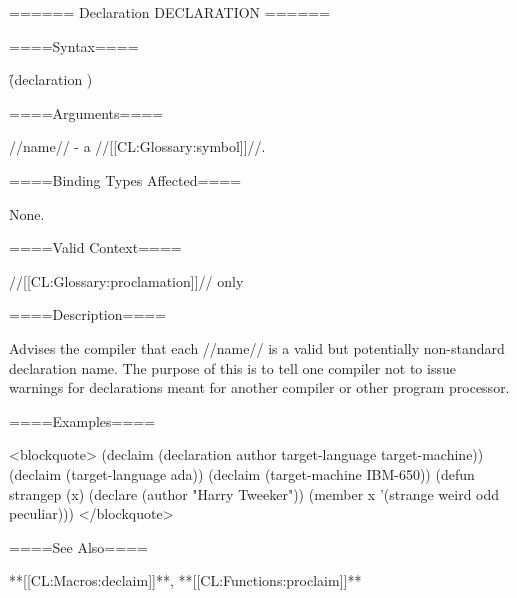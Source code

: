 ====== Declaration DECLARATION ======

====Syntax====

\f{(declaration )}

====Arguments====

//name// - a //[[CL:Glossary:symbol]]//.

====Binding Types Affected====

None.

====Valid Context====

//[[CL:Glossary:proclamation]]// only

====Description====

Advises the compiler that each //name// is a valid but potentially non-standard declaration name. The purpose of this is to tell one compiler not to issue warnings for declarations meant for another compiler or other program processor.

====Examples====

<blockquote> (declaim (declaration author target-language target-machine)) (declaim (target-language ada)) (declaim (target-machine IBM-650)) (defun strangep (x) (declare (author "Harry Tweeker")) (member x '(strange weird odd peculiar))) </blockquote>

====See Also====

**[[CL:Macros:declaim]]**, **[[CL:Functions:proclaim]]**

